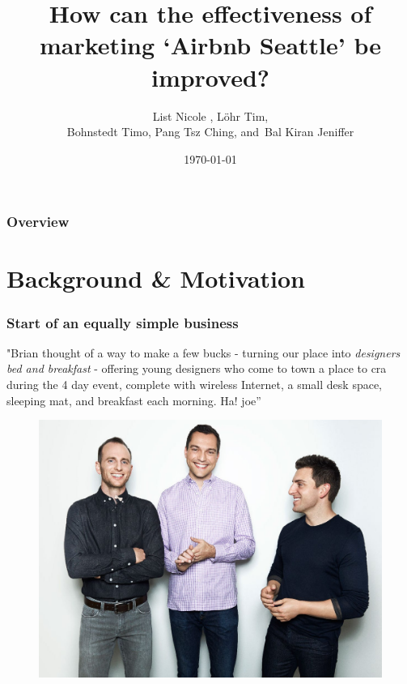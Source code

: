 \documentclass{beamer}
\title[Improve Airbnb's marketing]{How can the effectiveness of marketing ‘Airbnb Seattle’ be improved?} %
\author{List Nicole ,
      L\"ohr Tim,\\
      Bohnstedt Timo,
      Pang Tsz Ching,
      and~Bal Kiran Jeniffer%
      }
\institute[Information Systems] %
{
City University of Hong Kong\\ %
\medskip
\textit{Project Presentation
Machine Learning for Business IS4861 } 
}
\date{\today} %
\begin{document}
\begin{frame}
\titlepage %
\end{frame}
\begin{frame}
\frametitle{Overview} %
\tableofcontents %
\end{frame}
%

\section{Background \& Motivation}

\begin{frame}
\frametitle{Start of an equally simple business}
"Brian thought of a way to make a few bucks - turning
our place into \textit{designers bed and breakfast} - offering young
designers who come to town a place to cra during the 4 day
event, complete with wireless Internet, a small desk space,
sleeping mat, and breakfast each morning. Ha!
joe”
\begin{figure}
\includegraphics[width=0.4\linewidth]{founders}
\end{figure}
\end{frame}
\end{document}
